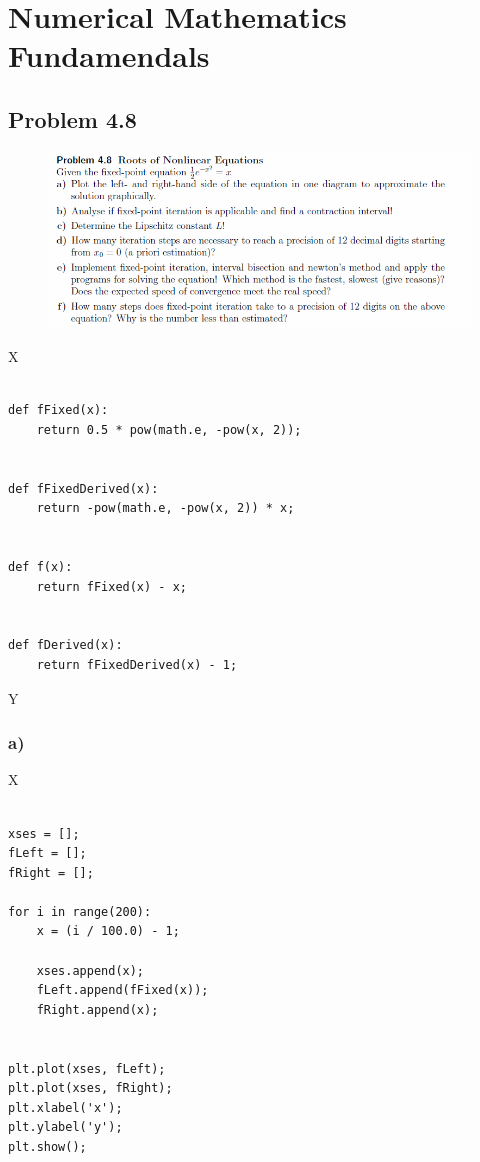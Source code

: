 \section{Numerical Mathematics Fundamendals}


\subsection{Problem 4.8}


\begin{figure}[!ht]
\includegraphics[width=1\textwidth]{chapters/images/desc-4-8}
\end{figure}


X

\begin{lstlisting}[caption=todo]

def fFixed(x):
	return 0.5 * pow(math.e, -pow(x, 2));


def fFixedDerived(x):
	return -pow(math.e, -pow(x, 2)) * x;


def f(x):
	return fFixed(x) - x;


def fDerived(x):
	return fFixedDerived(x) - 1;

\end{lstlisting}

Y


\subsubsection{a)}

X

\begin{lstlisting}[caption=todo]

xses = [];
fLeft = [];
fRight = [];

for i in range(200):
	x = (i / 100.0) - 1;
	
	xses.append(x);
	fLeft.append(fFixed(x));
	fRight.append(x);


plt.plot(xses, fLeft);
plt.plot(xses, fRight);
plt.xlabel('x');
plt.ylabel('y');
plt.show();


\end{lstlisting}


